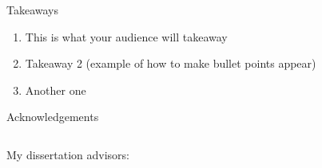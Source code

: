 \documentclass[9pt,aspectratio=169]{beamer}
\begin{document}
\begin{frame}{Takeaways}
    \vspace{3mm}
\begin{enumerate}[<+->]
    \itemsep1.5em
    \item This is what your audience will takeaway
    \item Takeaway 2 (example of how to make bullet points appear)
    \item Another one
\end{enumerate} 
\end{frame}
\begin{frame}{Acknowledgements}
\begin{columns}[T]
\begin{column}{.5\textwidth}
\vspace{2mm}
My dissertation advisors:


\end{column}
\end{columns}
\end{frame}
\end{document}
